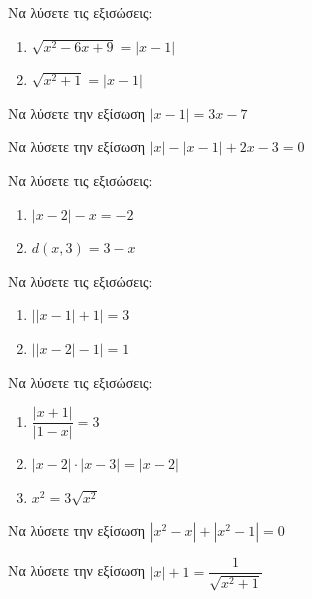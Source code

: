 \documentclass{presentation}
\begin{document}
\begin{askisi}
  Να λύσετε τις εξισώσεις:
  \begin{enumerate}[<+->]
    \item $\sqrt{x^2-6x+9}=|x-1|$
    \item $\sqrt{x^2+1}=|x-1|$
  \end{enumerate}
\end{askisi}

\begin{askisi}
  Να λύσετε την εξίσωση $|x-1|=3x-7$
\end{askisi}

\begin{askisi}
  Να λύσετε την εξίσωση $|x|-|x-1|+2x-3=0$
\end{askisi}

\begin{askisi}
  Να λύσετε τις εξισώσεις:
  \begin{enumerate}[<+->]
    \item $|x-2|-x=-2$
    \item $d(x,3)=3-x$
  \end{enumerate}
\end{askisi}

\begin{askisi}
  Να λύσετε τις εξισώσεις:
  \begin{enumerate}[<+->]
    \item $\left| |x-1| +1\right|=3$
    \item $\left| |x-2| -1\right|=1$
  \end{enumerate}
\end{askisi}

\begin{askisi}
  Να λύσετε τις εξισώσεις:
  \begin{enumerate}[<+->]
    \item $\dfrac{|x+1|}{|1-x|}=3$
    \item $|x-2|\cdot |x-3|=|x-2|$
    \item $x^2=3\sqrt{x^2}$
  \end{enumerate}
\end{askisi}

\begin{askisi}
  Να λύσετε την εξίσωση $|x^2-x|+|x^2-1|=0$
\end{askisi}

\begin{askisi}
  Να λύσετε την εξίσωση $|x|+1=\dfrac{1}{\sqrt{x^2+1}}$
\end{askisi}

\moodle
\end{document}
